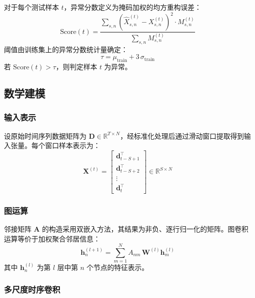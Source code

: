 \documentclass[UTF8]{ctexart}
\begin{document}
对于每个测试样本 $t$，异常分数定义为掩码加权的均方重构误差：
\begin{equation}
    \mathrm{Score}(t) = \frac{\sum_{s,n} \left(\hat{X}_{s,n}^{(t)} - X_{s,n}^{(t)}\right)^2 \cdot M_{s,n}^{(t)}}{\sum_{s,n} M_{s,n}^{(t)}}
\end{equation}
阈值由训练集上的异常分数统计量确定：
\begin{equation}
    \tau = \mu_{\text{train}} + 3 \, \sigma_{\text{train}}
\end{equation}
若 $\mathrm{Score}(t) > \tau$，则判定样本 $t$ 为异常。

\subsection{数学建模}

\subsubsection{输入表示}

设原始时间序列数据矩阵为 $\mathbf{D} \in \mathbb{R}^{T \times N}$，经标准化处理后通过滑动窗口提取得到输入张量。每个窗口样本表示为：
\begin{equation}
    \mathbf{X}^{(t)} = \begin{bmatrix} \mathbf{d}_{t-S+1}^\top \\ \mathbf{d}_{t-S+2}^\top \\ \vdots \\ \mathbf{d}_t^\top \end{bmatrix} \in \mathbb{R}^{S \times N}
\end{equation}

\subsubsection{图运算}

邻接矩阵 $\mathbf{A}$ 的构造采用双嵌入方法，其结果为非负、逐行归一化的矩阵。图卷积运算等价于加权聚合邻居信息：
\begin{equation}
    \mathbf{h}_n^{(l+1)} = \sum_{m=1}^{N} A_{nm} \, \mathbf{W}^{(l)} \mathbf{h}_m^{(l)}
\end{equation}
其中 $\mathbf{h}_n^{(l)}$ 为第 $l$ 层中第 $n$ 个节点的特征表示。

\subsubsection{多尺度时序卷积}
\end{document}
